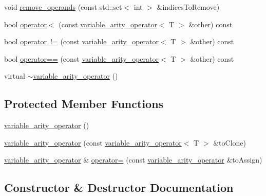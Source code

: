 \begin{DoxyCompactItemize}
\item 
void \mbox{\hyperlink{classvariable__arity__operator_a6695e38c33b73a8c61db982d4ab6fa1d}{remove\+\_\+operands}} (const std\+::set$<$ int $>$ \&indices\+To\+Remove)
\item 
bool \mbox{\hyperlink{classvariable__arity__operator_a75174e132e55220f4ff58538280c3b80}{operator$<$}} (const \mbox{\hyperlink{classvariable__arity__operator}{variable\+\_\+arity\+\_\+operator}}$<$ T $>$ \&other) const
\item 
bool \mbox{\hyperlink{classvariable__arity__operator_ab9a37ed2600d3a1778a1179dadb2f74c}{operator !=}} (const \mbox{\hyperlink{classvariable__arity__operator}{variable\+\_\+arity\+\_\+operator}}$<$ T $>$ \&other) const
\item 
bool \mbox{\hyperlink{classvariable__arity__operator_a02ba776fcea71188e25e1144c818df88}{operator==}} (const \mbox{\hyperlink{classvariable__arity__operator}{variable\+\_\+arity\+\_\+operator}}$<$ T $>$ \&other) const
\item 
virtual \mbox{\hyperlink{classvariable__arity__operator_ab39270d60125d24ac74a1dbebe62a789}{$\sim$variable\+\_\+arity\+\_\+operator}} ()
\end{DoxyCompactItemize}
\subsection*{Protected Member Functions}
\begin{DoxyCompactItemize}
\item 
\mbox{\hyperlink{classvariable__arity__operator_a6067a5e35bf8db1c109e72cb5a506816}{variable\+\_\+arity\+\_\+operator}} ()
\item 
\mbox{\hyperlink{classvariable__arity__operator_a634c5fc7b2ef20999ee8763ae4801b53}{variable\+\_\+arity\+\_\+operator}} (const \mbox{\hyperlink{classvariable__arity__operator}{variable\+\_\+arity\+\_\+operator}}$<$ T $>$ \&to\+Clone)
\item 
\mbox{\hyperlink{classvariable__arity__operator}{variable\+\_\+arity\+\_\+operator}} \& \mbox{\hyperlink{classvariable__arity__operator_ac202af79e996beb613110b1b6b0572a0}{operator=}} (const \mbox{\hyperlink{classvariable__arity__operator}{variable\+\_\+arity\+\_\+operator}} \&to\+Assign)
\end{DoxyCompactItemize}


\subsection{Constructor \& Destructor Documentation}
\mbox{\label{classvariable__arity__operator_a6067a5e35bf8db1c109e72cb5a506816}} 
